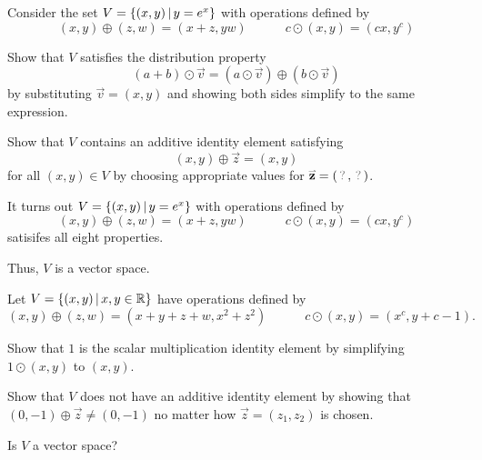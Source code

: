 \begin{applicationActivities}
\begin{activity}{20}
  Consider the set \(V=\left\{(x,y)\,\middle|\,y=e^x\right\}\) with operations defined by
  \[
    (x,y)\oplus (z,w)=(x+z,yw)
      \hspace{3em}
    c\odot (x,y)=(cx,y^c)
  \]
  \begin{subactivity}
  Show that \(V\) satisfies the distribution property
  \[(a+b)\odot\vec v=(a\odot\vec v)\oplus (b\odot\vec v)\]
  by substituting \(\vec v=(x,y)\) and showing both sides simplify to the same
  expression.
  \end{subactivity}
  \begin{subactivity}%
  Show that \(V\) contains an additive identity element satisfying
  \[(x,y)\oplus\vec{z}=(x,y)\]
  for all \((x,y)\in V\)
  by choosing appropriate values for \(\vec{z}=(\unknown,\unknown)\). 
  \end{subactivity}
\end{activity}


\begin{remark}
  It turns out \(V=\left\{(x,y)\,\middle|\,y=e^x\right\}\) with operations defined by
  \[
    (x,y)\oplus (z,w)=(x+z,yw)
      \hspace{3em}
    c\odot (x,y)=(cx,y^c)
  \]
  satisifes all eight properties.

  \vectorSpaceProperties

  Thus, \(V\) is a vector space.
\end{remark}





\begin{activity}{15}
  Let \(V=\left\{(x,y)\,\middle|\,x,y\in\mathbb{R}\right\}\) have operations defined by
  \[
    (x,y)\oplus (z,w)=(x+y+z+w,x^2+z^2)
      \hspace{3em}
    c\odot (x,y)=(x^c,y+c-1)
  .\]

  \begin{subactivity}
    Show that \(1\) is the scalar multiplication identity element
	by simplifying \(1\odot(x,y)\) to \((x,y)\).
  \end{subactivity}

  \begin{subactivity}
    Show that \(V\) does not have an additive identity element by showing that 
	\((0,-1)\oplus\vec z\not=(0,-1)\) no matter how
    \(\vec z=(z_1,z_2)\) is chosen.
  \end{subactivity}

  \begin{subactivity}
    Is \(V\) a vector space?
  \end{subactivity}
\end{activity}


\end{applicationActivities}
